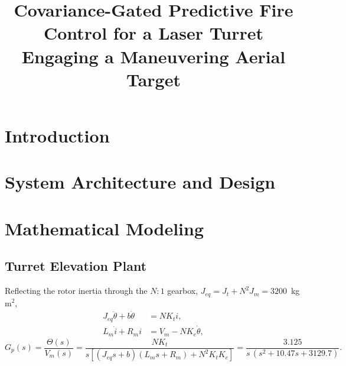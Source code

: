 \documentclass[conference]{IEEEtran}
\begin{document}
\title{Covariance-Gated Predictive Fire Control for a Laser Turret Engaging a Maneuvering Aerial Target}
\author{}
\maketitle

\begin{abstract}
\end{abstract}

\section{Introduction}

\section{System Architecture and Design}

\section{Mathematical Modeling}
\subsection{Turret Elevation Plant}
Reflecting the rotor inertia through the $N{:}1$ gearbox, $J_{eq}=J_t+N^2J_m=3200$~kg\,m$^2$,
\begin{align}
J_{eq}\ddot\theta + b\dot\theta &= N K_t i, \\
L_m \dot i + R_m i &= V_m - N K_e \dot\theta,
\end{align}
\begin{equation}
G_p(s)=\frac{\Theta(s)}{V_m(s)}=\frac{NK_t}{s\left[(J_{eq}s+b)(L_ms+R_m)+N^2K_tK_e\right]}
=\frac{3.125}{s\,(s^2+10.47s+3129.7)}.
\end{equation}
\end{document}
